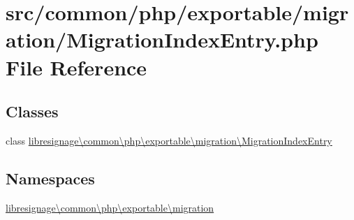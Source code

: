 \hypertarget{MigrationIndexEntry_8php}{}\section{src/common/php/exportable/migration/\+Migration\+Index\+Entry.php File Reference}
\label{MigrationIndexEntry_8php}
\subsection*{Classes}
\begin{DoxyCompactItemize}
\item 
class \hyperlink{classlibresignage_1_1common_1_1php_1_1exportable_1_1migration_1_1MigrationIndexEntry}{libresignage\textbackslash{}common\textbackslash{}php\textbackslash{}exportable\textbackslash{}migration\textbackslash{}\+Migration\+Index\+Entry}
\end{DoxyCompactItemize}
\subsection*{Namespaces}
\begin{DoxyCompactItemize}
\item 
 \hyperlink{namespacelibresignage_1_1common_1_1php_1_1exportable_1_1migration}{libresignage\textbackslash{}common\textbackslash{}php\textbackslash{}exportable\textbackslash{}migration}
\end{DoxyCompactItemize}
